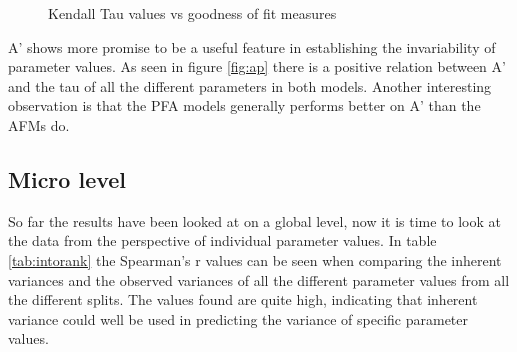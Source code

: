 \documentclass{scrartcl}
\begin{document}
\begin{figure}[!htbp]
\centering
{}
\caption{Kendall Tau values vs goodness of fit measures}
\end{figure}

A' shows more promise to be a useful feature in establishing the invariability of parameter values. As seen in figure \ref{fig:ap} there is a positive relation between A' and the tau of all the different parameters in both models. Another interesting observation is that the PFA models generally performs better on A' than the AFMs do.

\subsection{Micro level}
So far the results have been looked at on a global level, now it is time to look at the data from the perspective of individual parameter values. In table \ref{tab:intorank} the Spearman's r values can be seen when comparing the inherent variances and the observed variances of all the different parameter values from all the different splits. The values found are quite high, indicating that inherent variance could well be used in predicting the variance of specific parameter values. 
\end{document}
